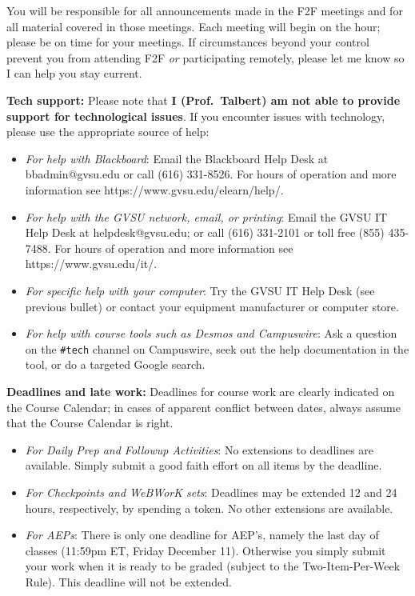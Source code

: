 \documentclass[]{article}
\providecommand{\tightlist}{%
  \setlength{\itemsep}{0pt}\setlength{\parskip}{0pt}}
\begin{document}
You will be responsible for all announcements made in the F2F meetings
and for all material covered in those meetings. Each meeting will begin
on the hour; please be on time for your meetings. If circumstances
beyond your control prevent you from attending F2F \emph{or}
participating remotely, please let me know so I can help you stay
current.

\textbf{Tech support:} Please note that \textbf{I (Prof.~Talbert) am not
able to provide support for technological issues}. If you encounter
issues with technology, please use the appropriate source of help:

\begin{itemize}
\tightlist
\item
  \emph{For help with Blackboard}: Email the Blackboard Help Desk at
  bbadmin@gvsu.edu or call (616) 331-8526. For hours of operation and
  more information see https://www.gvsu.edu/elearn/help/.
\item
  \emph{For help with the GVSU network, email, or printing}: Email the
  GVSU IT Help Desk at helpdesk@gvsu.edu; or call (616) 331-2101 or toll
  free (855) 435-7488. For hours of operation and more information see
  https://www.gvsu.edu/it/.
\item
  \emph{For specific help with your computer}: Try the GVSU IT Help Desk
  (see previous bullet) or contact your equipment manufacturer or
  computer store.
\item
  \emph{For help with course tools such as Desmos and Campuswire}: Ask a
  question on the \texttt{\#tech} channel on Campuswire, seek out the
  help documentation in the tool, or do a targeted Google search.
\end{itemize}

\textbf{Deadlines and late work:} Deadlines for course work are clearly
indicated on the Course Calendar; in cases of apparent conflict between
dates, always assume that the Course Calendar is right.

\begin{itemize}
\tightlist
\item
  \emph{For Daily Prep and Followup Activities}: No extensions to
  deadlines are available. Simply submit a good faith effort on all
  items by the deadline.
\item
  \emph{For Checkpoints and WeBWorK sets}: Deadlines may be extended 12
  and 24 hours, respectively, by spending a token. No other extensions
  are available.
\item
  \emph{For AEPs}: There is only one deadline for AEP's, namely the last
  day of classes (11:59pm ET, Friday December 11). Otherwise you simply
  submit your work when it is ready to be graded (subject to the
  Two-Item-Per-Week Rule). This deadline will not be extended.
\end{itemize}
\end{document}
